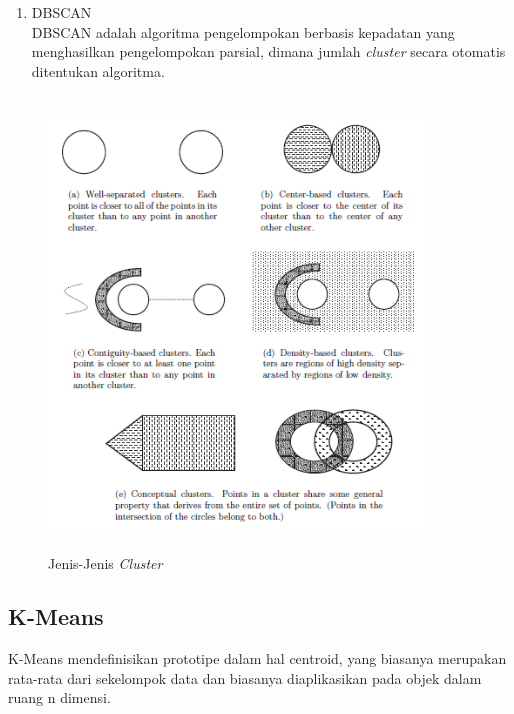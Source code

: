 \begin{enumerate}
\begin{enumerate}
            \item DBSCAN \\
                DBSCAN adalah algoritma pengelompokan berbasis kepadatan yang menghasilkan pengelompokan parsial, dimana jumlah \textit{cluster} secara otomatis ditentukan algoritma. 
            
        \end{enumerate}
    
\end{enumerate}


\begin{figure}[H]
    \centering
    \includegraphics[width = 10cm, height = 12cm]{doc/DokumenSkripsi/Gambar/gambar22.PNG}
    \caption{Jenis-Jenis \textit{Cluster}}
    \label{fig:jenis cluster}
\end{figure}



\subsection{K-Means}
\label{subsec:dasar teori K-Means}
K-Means \cite{buku:data:mining} mendefinisikan prototipe dalam hal centroid, yang biasanya merupakan rata-rata dari sekelompok data dan biasanya diaplikasikan pada objek dalam ruang n dimensi.

